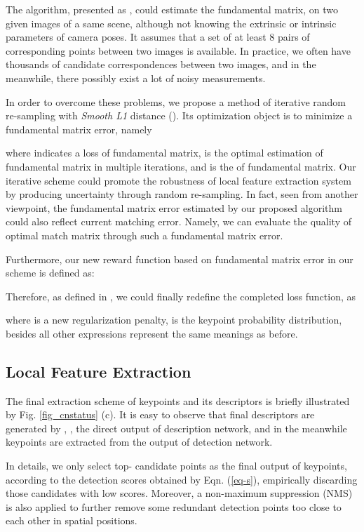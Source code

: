 \documentclass[journal]{IEEEtran}
\begin{document}
The  algorithm, presented as , could estimate the fundamental matrix,  on two given images of a same scene, although not knowing the extrinsic or intrinsic parameters of camera poses. It assumes that a set of at least 8 pairs of corresponding points between two images is available. In practice, we often have thousands of candidate correspondences between two images, and in the meanwhile, there possibly exist a lot of noisy measurements. 

In order to overcome these problems, we propose a method of iterative random re-sampling with \emph{\rm Smooth L1} distance (). Its optimization object is to minimize a fundamental matrix error, namely  

where  indicates a loss of fundamental matrix,  is the optimal estimation of fundamental matrix in multiple iterations, 
and  is the  of fundamental matrix. 
Our iterative scheme could promote the robustness of local feature extraction system by producing uncertainty through random re-sampling. In fact, seen from another viewpoint, the fundamental matrix error estimated by our proposed algorithm could also reflect current matching error. Namely, we can evaluate the quality of optimal match matrix  through such a fundamental matrix error. 


Furthermore, our new reward function based on fundamental matrix error in our scheme is defined as:

Therefore, as defined in \cite{li2022decoupling}, we could finally redefine the completed loss function,  as

where  is a new regularization penalty,  is the keypoint probability distribution, besides all other expressions represent the same meanings as before.


\subsection{Local Feature Extraction}

The final extraction scheme of keypoints and its descriptors is briefly illustrated by Fig. \ref{fig_cnstatus} (c). 
It is easy to observe that final descriptors are generated by , , the direct output of description network, and in the meanwhile keypoints are extracted from the output of detection network.

In details, we only select top- candidate points 
as the final output of keypoints, according to the detection scores obtained by Eqn. (\ref{eq-s}), empirically discarding those candidates with low scores. Moreover, a non-maximum suppression (NMS) \cite{NMS} is also applied to further remove some redundant detection points too close to each other in spatial positions. 
\end{document}
